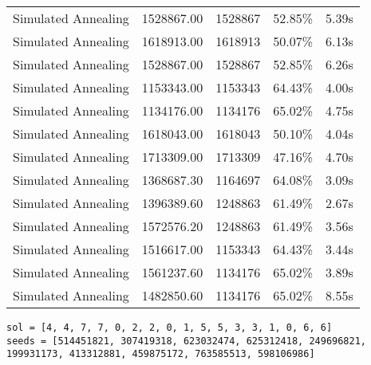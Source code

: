 \begin{table}[ht]
\begin{tabular}{|r|r|r|r|r|}
Simulated Annealing & 1528867.00 & 1528867 & 52.85\% & 5.39s\\
Simulated Annealing & 1618913.00 & 1618913 & 50.07\% & 6.13s\\
Simulated Annealing & 1528867.00 & 1528867 & 52.85\% & 6.26s\\
Simulated Annealing & 1153343.00 & 1153343 & 64.43\% & 4.00s\\
Simulated Annealing & 1134176.00 & 1134176 & 65.02\% & 4.75s\\
Simulated Annealing & 1618043.00 & 1618043 & 50.10\% & 4.04s\\
Simulated Annealing & 1713309.00 & 1713309 & 47.16\% & 4.70s\\
Simulated Annealing & 1368687.30 & 1164697 & 64.08\% & 3.09s\\
Simulated Annealing & 1396389.60 & 1248863 & 61.49\% & 2.67s\\
Simulated Annealing & 1572576.20 & 1248863 & 61.49\% & 3.56s\\
Simulated Annealing & 1516617.00 & 1153343 & 64.43\% & 3.44s\\
Simulated Annealing & 1561237.60 & 1134176 & 65.02\% & 3.89s\\
Simulated Annealing & 1482850.60 & 1134176 & 65.02\% & 8.55s\\
\end{tabular}%
\end{table}
\begin{lstlisting}[label={lst:call7vehicle3},caption=Optimal solution call\_7\_vehicle\_3]
sol = [4, 4, 7, 7, 0, 2, 2, 0, 1, 5, 5, 3, 3, 1, 0, 6, 6]
seeds = [514451821, 307419318, 623032474, 625312418, 249696821, 199931173, 413312881, 459875172, 763585513, 598106986]
\end{lstlisting}%
\clearpage


